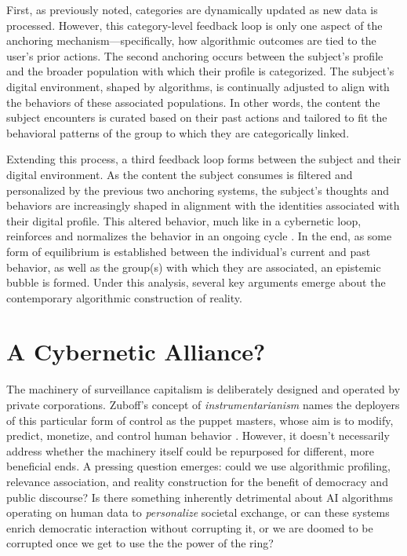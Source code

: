 First, as previously noted, categories are dynamically updated as new data is processed. However, this category-level feedback loop is only one aspect of the anchoring mechanism—specifically, how algorithmic outcomes are tied to the user's prior actions. The second anchoring occurs between the subject's profile and the broader population with which their profile is categorized. The subject's digital environment, shaped by algorithms, is continually adjusted to align with the behaviors of these associated populations. In other words, the content the subject encounters is curated based on their past actions and tailored to fit the behavioral patterns of the group to which they are categorically linked.

Extending this process, a third feedback loop forms between the subject and their digital environment. As the content the subject consumes is filtered and personalized by the previous two anchoring systems, the subject’s thoughts and behaviors are increasingly shaped in alignment with the identities associated with their digital profile. This altered behavior, much like in a cybernetic loop, reinforces and normalizes the behavior in an ongoing cycle \parencite[244-249]{Just2017}. In the end, as some form of equilibrium is established between the individual's current and past behavior, as well as the group(s) with which they are associated, an epistemic bubble is formed. Under this analysis, several key arguments emerge about the contemporary algorithmic construction of reality.

\section{A Cybernetic Alliance?}

The machinery of surveillance capitalism is deliberately designed and operated by private corporations. Zuboff's concept of \textit{instrumentarianism} names the deployers of this particular form of control as the puppet masters, whose aim is to modify, predict, monetize, and control human behavior \parencite*[331]{zuboff2019}. However, it doesn't necessarily address whether the machinery itself could be repurposed for different, more beneficial ends. A pressing question emerges: could we use algorithmic profiling, relevance association, and reality construction for the benefit of democracy and public discourse? Is there something inherently detrimental about AI algorithms operating on human data to \textit{personalize} societal exchange, or can these systems enrich democratic interaction without corrupting it, or we are doomed to be corrupted once we get to use the the power of the ring?        

